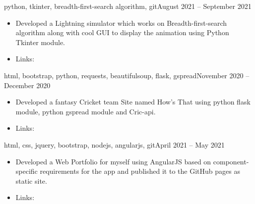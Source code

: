 \documentclass[10pt,a4paper]{altacv}
\newcommand{\ExternalLink}{%
    \tikz[x=1.2ex, y=1.2ex, baseline=-0.05ex]{%
        \begin{scope}[x=1ex, y=1ex]
            \clip (-0.1,-0.1) 
                --++ (-0, 1.2) 
                --++ (0.6, 0) 
                --++ (0, -0.6) 
                --++ (0.6, 0) 
                --++ (0, -1);
            \path[draw, 
                line width = 0.5, 
                rounded corners=0.5] 
                (0,0) rectangle (1,1);
        \end{scope}
        \path[draw, line width = 0.5] (0.5, 0.5) 
            -- (1, 1);
        \path[draw, line width = 0.5] (0.6, 1) 
            -- (1, 1) -- (1, 0.6);
        }
    }
\begin{document}















{\MakeLowercase{Python, Tkinter, Breadth-First-search algorithm, Git}}{August 2021 -- September 2021}{}
\begin{itemize}
\item Developed a Lightning simulator which works on Breadth-first-search algorithm along with cool GUI to display the animation using Python Tkinter module.
\item Links: 
\end{itemize}
\divider

{\MakeLowercase{html, Bootstrap, Python, requests, BeautifulSoup, flask, gspread}}{November 2020 -- December 2020}{}
\begin{itemize}
\item Developed a fantasy Cricket team Site named How's That using python flask module, python gspread module and Cric-api.
\item Links: 
\end{itemize}
\divider


{\MakeLowercase{HTML, CSS, jQuery, Bootstrap, Nodejs, AngularJS, Git}}{April 2021 -- May 2021}{}
\begin{itemize}
\item Developed a Web Portfolio for myself using AngularJS based on component-specific requirements for the app and published it to the GitHub pages as static site.
\item Links: 
\end{itemize}
\divider
\end{document}
